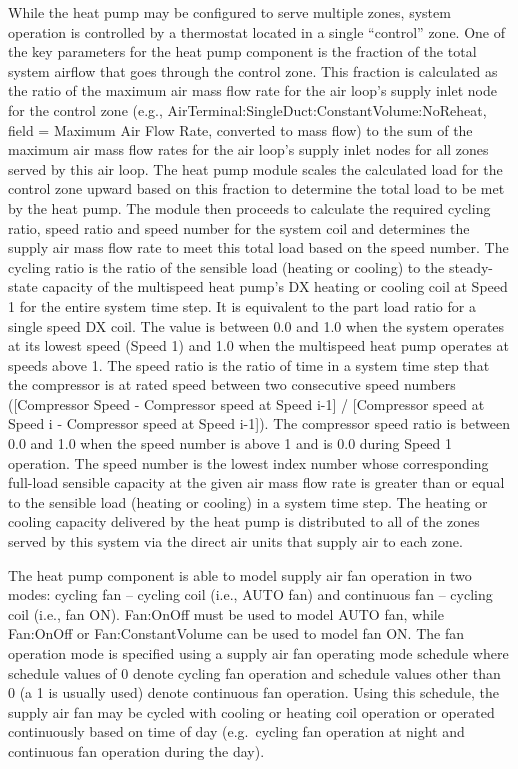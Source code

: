 While the heat pump may be configured to serve multiple zones, system operation is controlled by a thermostat located in a single ``control'' zone. One of the key parameters for the heat pump component is the fraction of the total system airflow that goes through the control zone. This fraction is calculated as the ratio of the maximum air mass flow rate for the air loop's supply inlet node for the control zone (e.g., AirTerminal:SingleDuct:ConstantVolume:NoReheat, field = Maximum Air Flow Rate, converted to mass flow) to the sum of the maximum air mass flow rates for the air loop's supply inlet nodes for all zones served by this air loop. The heat pump module scales the calculated load for the control zone upward based on this fraction to determine the total load to be met by the heat pump. The module then proceeds to calculate the required cycling ratio, speed ratio and speed number for the system coil and determines the supply air mass flow rate to meet this total load based on the speed number. The cycling ratio is the ratio of the sensible load (heating or cooling) to the steady-state capacity of the multispeed heat pump's DX heating or cooling coil at Speed 1 for the entire system time step. It is equivalent to the part load ratio for a single speed DX coil. The value is between 0.0 and 1.0 when the system operates at its lowest speed (Speed 1) and 1.0 when the multispeed heat pump operates at speeds above 1. The speed ratio is the ratio of time in a system time step that the compressor is at rated speed between two consecutive speed numbers ({[}Compressor Speed - Compressor speed at Speed i-1{]} / {[}Compressor speed at Speed i - Compressor speed at Speed i-1{]}). The compressor speed ratio is between 0.0 and 1.0 when the speed number is above 1 and is 0.0 during Speed 1 operation. The speed number is the lowest index number whose corresponding full-load sensible capacity at the given air mass flow rate is greater than or equal to the sensible load (heating or cooling) in a system time step. The heating or cooling capacity delivered by the heat pump is distributed to all of the zones served by this system via the direct air units that supply air to each zone.

The heat pump component is able to model supply air fan operation in two modes: cycling fan -- cycling coil (i.e., AUTO fan) and continuous fan -- cycling coil (i.e., fan ON). Fan:OnOff must be used to model AUTO fan, while Fan:OnOff or Fan:ConstantVolume can be used to model fan ON. The fan operation mode is specified using a supply air fan operating mode schedule where schedule values of 0 denote cycling fan operation and schedule values other than 0 (a 1 is usually used) denote continuous fan operation. Using this schedule, the supply air fan may be cycled with cooling or heating coil operation or operated continuously based on time of day (e.g.~cycling fan operation at night and continuous fan operation during the day).

